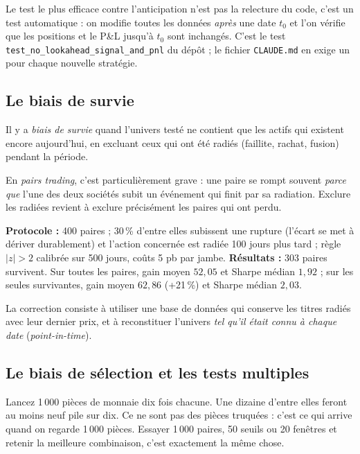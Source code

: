 \begin{pitfall}
Le test le plus efficace contre l'anticipation n'est pas la relecture du code, c'est un test automatique : on modifie toutes les données \emph{après} une date $t_0$ et l'on vérifie que les positions et le P\&L jusqu'à $t_0$ sont inchangés. C'est le test \texttt{test\_no\_lookahead\_signal\_and\_pnl} du dépôt ; le fichier \texttt{CLAUDE.md} en exige un pour chaque nouvelle stratégie.
\end{pitfall}

\subsection{Le biais de survie}

\begin{definition}
Il y a \emph{biais de survie} quand l'univers testé ne contient que les actifs qui existent encore aujourd'hui, en excluant ceux qui ont été radiés (faillite, rachat, fusion) pendant la période.
\end{definition}

En \emph{pairs trading}, c'est particulièrement grave : une paire se rompt souvent \emph{parce que} l'une des deux sociétés subit un événement qui finit par sa radiation. Exclure les radiées revient à exclure précisément les paires qui ont perdu.

\begin{codebox}
\textbf{Protocole :} 400 paires ; 30\,\% d'entre elles subissent une rupture (l'écart se met à dériver durablement) et l'action concernée est radiée 100 jours plus tard ; règle $|z|>2$ calibrée sur 500 jours, coûts 5 pb par jambe. \textbf{Résultats :} 303 paires survivent. Sur toutes les paires, gain moyen $52{,}05$ et Sharpe médian $1{,}92$ ; sur les seules survivantes, gain moyen $62{,}86$ (+21\,\%) et Sharpe médian $2{,}03$.
\end{codebox}

La correction consiste à utiliser une base de données qui conserve les titres radiés avec leur dernier prix, et à reconstituer l'univers \emph{tel qu'il était connu à chaque date} (\emph{point-in-time}).

\subsection{Le biais de sélection et les tests multiples}

\begin{intuition}
Lancez 1\,000 pièces de monnaie dix fois chacune. Une dizaine d'entre elles feront au moins neuf \og pile\fg{} sur dix. Ce ne sont pas des pièces truquées : c'est ce qui arrive quand on regarde 1\,000 pièces. Essayer 1\,000 paires, 50 seuils ou 20 fenêtres et retenir la meilleure combinaison, c'est exactement la même chose.
\end{intuition}

